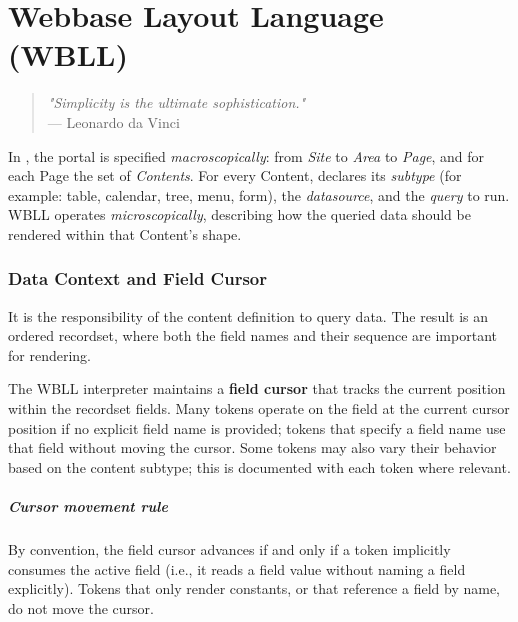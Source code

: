 
\chapter{Webbase Layout Language (WBLL)}
\label{chap:wbll}

\begin{quote}
\textit{"Simplicity is the ultimate sophistication."} \\
— Leonardo da Vinci
\end{quote}

In \wbdl{}, the portal is specified \textit{macroscopically}: from \emph{Site} to \emph{Area} to \emph{Page}, and for each Page the set of \emph{Contents}. For every Content, \wbdl{} declares its \emph{subtype} (for example: table, calendar, tree, menu, form), the \emph{datasource}, and the \emph{query} to run. WBLL operates \textit{microscopically}, describing how the queried data should be rendered within that Content’s shape.

\subsection{Data Context and Field Cursor}

It is the responsibility of the \wbdl{} content definition to query data. The result is an ordered recordset, where both the field names and their sequence are important for rendering.

The WBLL interpreter maintains a \textbf{field cursor} that tracks the current position within the recordset fields. Many tokens operate on the field at the current cursor position if no explicit field name is provided; tokens that specify a field name use that field without moving the cursor. Some tokens may also vary their behavior based on the content subtype; this is documented with each token where relevant.

\paragraph{Cursor movement rule}
By convention, the field cursor advances if and only if a token implicitly consumes the active field (i.e., it reads a field value without naming a field explicitly). Tokens that only render constants, or that reference a field by name, do not move the cursor.

